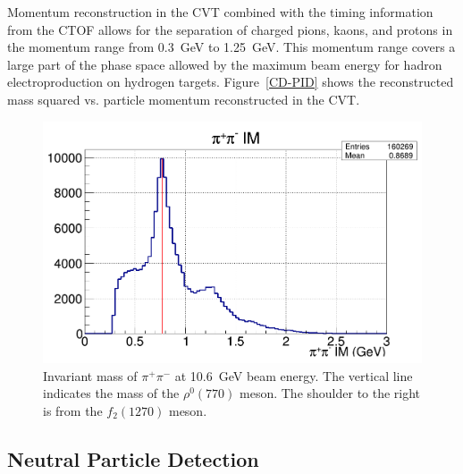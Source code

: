 \documentclass[final,3p,twocolumn]{elsarticle}
\begin{document}
Momentum reconstruction in the CVT combined with the timing information from the CTOF allows for the separation 
of charged pions, kaons, and protons in the momentum range from 0.3~GeV to 1.25~GeV. This momentum range covers
a large part of the phase space allowed by the maximum beam energy for hadron electroproduction on hydrogen targets.
Figure~\ref{CD-PID} shows the reconstructed mass squared vs. particle momentum reconstructed in the CVT.

\begin{figure}[t!]
\centerline{\includegraphics[width=1.0\columnwidth]{rhoMass.png}}
\caption{Invariant mass of $\pi^+\pi^-$ at 10.6~GeV beam energy. The vertical line indicates the mass of the
  $\rho^0(770)$ meson. The shoulder to the right is from the $f_2(1270)$ meson.}
\label{pip-pim-p}
\end{figure} 

\subsection{Neutral Particle Detection} 
\end{document}
